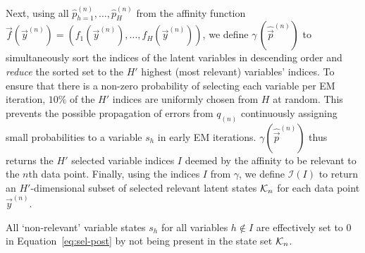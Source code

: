 %
Next, using all $\hat{p}_{h=1}^{(n)},\dots, \hat{p}_H^{(n)}$  
from the affinity function 
$\vec{f}(\vec{y}^{(n)}) = (f_1(\vec{y}^{(n)}), \dots, f_H(\vec{y}^{(n)}))$, we define 
 $\gamma\,(\hat{\vec{p}}^{(n)})$ to simultaneously sort the indices of the latent variables in descending order and \textit{reduce} the sorted set to the $H'$ highest (most relevant) variables' indices. %
To ensure that there is a non-zero probability of selecting each variable per EM iteration, $10\%$ of the $H'$ indices are uniformly chosen from $H$ at random. 
This prevents the possible propagation of errors from $q_{(n)}$ continuously assigning small probabilities to a variable $s_h$ in early EM
iterations. 
$\gamma(\hat{\vec{p}}^{(n)})$ thus returns the $H'$ selected variable indices $I$ deemed by the affinity to be relevant to the $n$th data point.
%
%
%
Finally, using the indices $I$ from $\gamma$, we define $\mathcal{I}(I)$ to return an 
$H'$-dimensional subset of selected relevant latent states $\mathcal{K}_{n}$ for each data point $\vec{y}^{(n)}$. 

All `non-relevant' variable states $s_h$ for all variables $h\not\in I$ are effectively set to $0$ in Equation~\eqref{eq:sel-post} 
by not being present in the state set $\mathcal{K}_{n}$.
%
%

